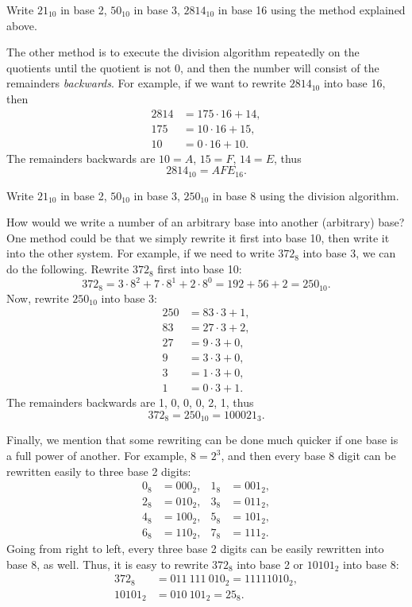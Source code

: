 \begin{exercise}\label{ex:numsyst1}
Write $21_{10}$ in base 2, 
$50_{10}$ in base 3, 
$2814_{10}$ in base 16 using the method explained above. 
\end{exercise}

The other method is to execute the division algorithm repeatedly on the quotients until the quotient is not 0, 
and then the number will consist of the remainders \emph{backwards}. 
For example, if we want to rewrite $2814_{10}$ into base 16, then 
\begin{align*}
2814 &= 175 \cdot 16 + 14, \\
175 &= 10 \cdot 16 + 15, \\
10 &= 0 \cdot 16 + 10. 
\end{align*}
The remainders backwards are $10=A$, $15=F$, $14=E$, thus 
\[
2814_{10} = AFE_{16}.
\]
\begin{exercise}\label{ex:numsyst2}
Write $21_{10}$ in base 2, 
$50_{10}$ in base 3, 
$250_{10}$ in base 8 using the division algorithm. 
\end{exercise}

How would we write a number of an arbitrary base into another (arbitrary) base? 
One method could be that we simply rewrite it first into base 10, 
then write it into the other system. 
For example, if we need to write $372_8$ into base 3, we can do the following. 
Rewrite $372_8$ first into base 10: 
\[
372_8 = 3 \cdot 8^2 + 7 \cdot 8^1 + 2 \cdot 8^0 = 192 + 56 + 2 = 250_{10}. 
\]
Now, rewrite $250_{10}$ into base 3:
\begin{align*}
250 &= 83 \cdot 3 + 1, \\
83 &= 27 \cdot 3 + 2, \\
27 &= 9 \cdot 3 + 0, \\
9 &= 3 \cdot 3 + 0, \\
3 &= 1 \cdot 3 + 0, \\
1 &= 0 \cdot 3 + 1. 
\end{align*}
The remainders backwards are 1, 0, 0, 0, 2, 1, thus 
\[
372_8 = 250_{10} = 100021_{3}. 
\]

Finally, we mention that some rewriting can be done much quicker if one base is a full power of another. 
For example, $8=2^3$, and then every base 8 digit can be rewritten easily to three base 2 digits: 
\begin{align*}
0_8 &= 000_2, & 1_8 &= 001_2, \\
2_8 &= 010_2, & 3_8 &= 011_2, \\
4_8 &= 100_2, & 5_8 &= 101_2, \\
6_8 &= 110_2, & 7_8 &= 111_2. 
\end{align*}
Going from right to left, 
every three base 2 digits can be easily rewritten into base 8, as well. 
Thus, it is easy to rewrite $372_8$ into base 2 or $10101_2$ into base 8: 
\begin{align*}
372_8 &= 011~111~010_2 = 11111010_2, \\
10101_2 &= 010~101_2 = 25_8. 
\end{align*}

